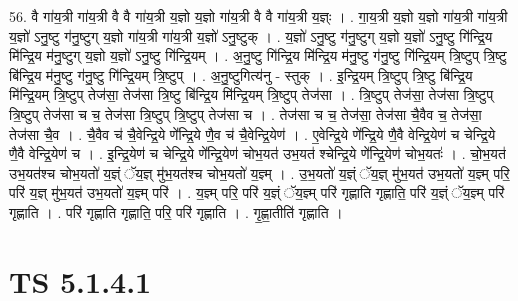 \documentclass[17pt]{extarticle}
\begin{document}
56. वै गा॑य॒त्री गा॑य॒त्री वै वै गा॑य॒त्री य॒ज्ञो य॒ज्ञो गा॑य॒त्री वै वै गा॑य॒त्री य॒ज्ञ्ः । . गा॒य॒त्री य॒ज्ञो य॒ज्ञो गा॑य॒त्री गा॑य॒त्री य॒ज्ञो॑ ऽनु॒ष्टु ग॑नु॒ष्टुग् य॒ज्ञो गा॑य॒त्री गा॑य॒त्री य॒ज्ञो॑ ऽनु॒ष्टुक् । . य॒ज्ञो॑ ऽनु॒ष्टु ग॑नु॒ष्टुग् य॒ज्ञो य॒ज्ञो॑ ऽनु॒ष्टु गि॑न्द्रि॒य मि॑न्द्रि॒य म॑नु॒ष्टुग् य॒ज्ञो य॒ज्ञो॑ ऽनु॒ष्टु गि॑न्द्रि॒यम् । . अ॒नु॒ष्टु गि॑न्द्रि॒य मि॑न्द्रि॒य म॑नु॒ष्टु ग॑नु॒ष्टु गि॑न्द्रि॒यम् त्रि॒ष्टुप् त्रि॒ष्टु बि॑न्द्रि॒य म॑नु॒ष्टु ग॑नु॒ष्टु गि॑न्द्रि॒यम् त्रि॒ष्टुप् । . अ॒नु॒ष्टुगित्य॑नु - स्तुक् । . इ॒न्द्रि॒यम् त्रि॒ष्टुप् त्रि॒ष्टु बि॑न्द्रि॒य मि॑न्द्रि॒यम् त्रि॒ष्टुप् तेज॑सा॒ तेज॑सा त्रि॒ष्टु बि॑न्द्रि॒य मि॑न्द्रि॒यम् त्रि॒ष्टुप् तेज॑सा । . त्रि॒ष्टुप् तेज॑सा॒ तेज॑सा त्रि॒ष्टुप् त्रि॒ष्टुप् तेज॑सा च च॒ तेज॑सा त्रि॒ष्टुप् त्रि॒ष्टुप् तेज॑सा च । . तेज॑सा च च॒ तेज॑सा॒ तेज॑सा चै॒वैव च॒ तेज॑सा॒ तेज॑सा चै॒व । . चै॒वैव च॑ चै॒वेन्द्रि॒ये णे᳚न्द्रि॒ये णै॒व च॑ चै॒वेन्द्रि॒येण॑ । . ए॒वेन्द्रि॒ये णे᳚न्द्रि॒ये णै॒वै वेन्द्रि॒येण॑ च चेन्द्रि॒ये णै॒वै वेन्द्रि॒येण॑ च । . इ॒न्द्रि॒येण॑ च चेन्द्रि॒ये णे᳚न्द्रि॒येण॑ चोभ॒यत॑ उभ॒यत॑ श्चेन्द्रि॒ये णे᳚न्द्रि॒येण॑ चोभ॒यतः॑ । . चो॒भ॒यत॑ उभ॒यत॑श्च चोभ॒यतो॑ य॒ज्ञ्ं ॅय॒ज्ञ् मु॑भ॒यत॑श्च चोभ॒यतो॑ य॒ज्ञ्म् । . उ॒भ॒यतो॑ य॒ज्ञ्ं ॅय॒ज्ञ् मु॑भ॒यत॑ उभ॒यतो॑ य॒ज्ञ्म् परि॒ परि॑ य॒ज्ञ् मु॑भ॒यत॑ उभ॒यतो॑ य॒ज्ञ्म् परि॑ । . य॒ज्ञ्म् परि॒ परि॑ य॒ज्ञ्ं ॅय॒ज्ञ्म् परि॑ गृह्णाति गृह्णाति॒ परि॑ य॒ज्ञ्ं ॅय॒ज्ञ्म् परि॑ गृह्णाति । . परि॑ गृह्णाति गृह्णाति॒ परि॒ परि॑ गृह्णाति । . गृ॒ह्णा॒तीति॑ गृह्णाति । \newline
\pagebreak
{}

\section{ TS 5.1.4.1 }
\end{document}
